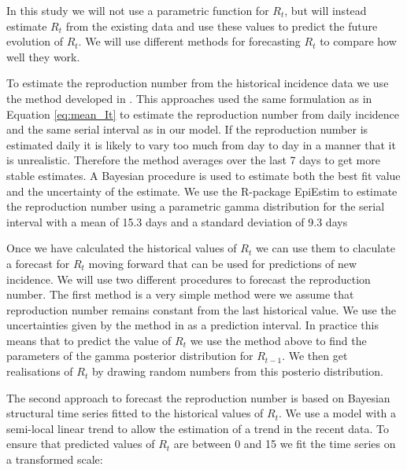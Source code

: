 \documentclass[12pt]{article}
\begin{document}


In this study we will not use a parametric function for $R_t$, but will instead estimate $R_t$ from the existing data and use these values to predict the future evolution of $R_t$. We will use different methods for forecasting $R_t$ to compare how well they work. 

To estimate the reproduction number from the historical incidence data we use the method developed in \cite{coriNewFrameworkSoftware2013,thompsonImprovedInferenceTimevarying2019}. This approaches used the same formulation as in Equation \ref{eq:mean_It} to estimate the reproduction number from daily incidence and the same serial interval as in our model. If the reproduction number is estimated daily it is likely to vary too much from day to day in a manner that it is unrealistic. Therefore the method averages over the last 7 days to get more stable estimates. A Bayesian procedure is used to estimate both the best fit value and the uncertainty of the estimate. We use the R-package EpiEstim \cite{coriEpiEstimEpiEstimPackage2013} to estimate the reproduction number using a parametric gamma distribution for the serial interval with a mean of 15.3 days and a standard deviation of 9.3 days \cite{whoebolaresponseteamEbolaVirusDisease2014}

Once we have calculated the historical values of $R_t$ we can use them to claculate a forecast for $R_t$ moving forward that can be used for predictions of new incidence. We will use two different procedures to forecast the reproduction number. The first method is a very simple method were we assume that reproduction number remains constant from the last historical value. We use the uncertainties given by the method in \cite{coriNewFrameworkSoftware2013} as a prediction interval. In practice this means that to predict the value of $R_t$ we use the method above to find the parameters of the gamma posterior distribution for $R_{t-1}$. We then get realisations of $R_t$ by drawing random numbers from this posterio distribution. 

The second approach to forecast the reproduction number is based on Bayesian structural time series fitted to the historical values of $R_t$. We use a model with a semi-local linear trend to allow the estimation of a trend in the recent data. To ensure that predicted values of $R_t$ are between 0 and 15 we fit the time series on a transformed scale:
\end{document}
